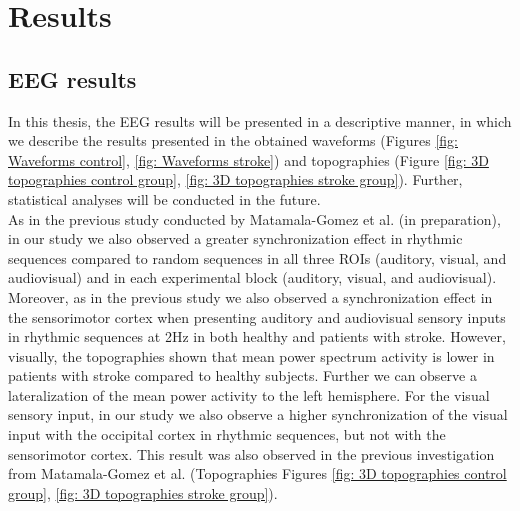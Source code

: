 \chapter{Results}
\section{EEG results}
In this thesis, the EEG results will be presented in a descriptive manner, in which we describe the results presented in the obtained waveforms (Figures \ref{fig: Waveforms control}, \ref{fig: Waveforms stroke}) and topographies (Figure \ref{fig: 3D topographies control group}, \ref{fig: 3D topographies stroke group}). Further, statistical analyses will be conducted in the future.  \\
As in the previous study conducted by Matamala-Gomez et al. (in preparation), in our study we  also observed a greater synchronization effect in rhythmic sequences compared to random sequences in all three ROIs (auditory, visual, and audiovisual) and in each experimental block (auditory, visual, and audiovisual). Moreover, as in the previous study we also observed a synchronization effect in the sensorimotor cortex when presenting auditory and audiovisual sensory inputs in rhythmic sequences at 2Hz in both healthy and patients with stroke. However, visually, the topographies shown that mean power spectrum activity is lower in patients with stroke compared to healthy subjects. Further we can observe a lateralization of the mean power activity to the left hemisphere. For the visual sensory input, in our study we also observe a higher synchronization of the visual input with the occipital cortex in rhythmic sequences, but not with the sensorimotor cortex. This result was also observed in the previous investigation from Matamala-Gomez et al. (Topographies Figures \ref{fig: 3D topographies control group}, \ref{fig: 3D topographies stroke group}).
